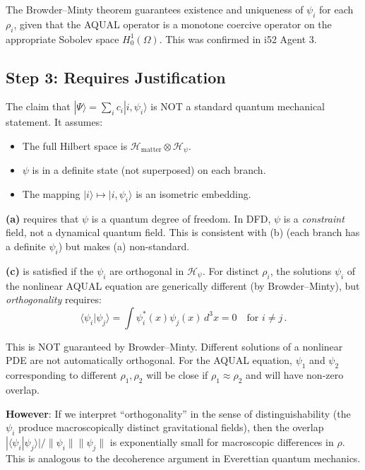 \documentclass[11pt,a4paper]{article}
\begin{document}
The Browder--Minty theorem guarantees existence and uniqueness of $\psi_i$ for each $\rho_i$, given that the AQUAL operator is a monotone coercive operator on the appropriate Sobolev space $H^1_0(\Omega)$. This was confirmed in i52 Agent 3.

\subsection{Step 3: Requires Justification}

The claim that $|\Psi\rangle = \sum_i c_i |i, \psi_i\rangle$ is NOT a standard quantum mechanical statement. It assumes:
\begin{itemize}
\item[(a)] The full Hilbert space is $\mathcal{H}_{\mathrm{matter}} \otimes \mathcal{H}_\psi$.
\item[(b)] $\psi$ is in a definite state (not superposed) on each branch.
\item[(c)] The mapping $|i\rangle \mapsto |i, \psi_i\rangle$ is an isometric embedding.
\end{itemize}

\textbf{(a)} requires that $\psi$ is a quantum degree of freedom. In DFD, $\psi$ is a \emph{constraint} field, not a dynamical quantum field. This is consistent with (b) (each branch has a definite $\psi_i$) but makes (a) non-standard.

\textbf{(c)} is satisfied if the $\psi_i$ are orthogonal in $\mathcal{H}_\psi$. For distinct $\rho_i$, the solutions $\psi_i$ of the nonlinear AQUAL equation are generically different (by Browder--Minty), but \emph{orthogonality} requires:
\begin{equation}
\langle \psi_i | \psi_j \rangle = \int \psi_i^*(x) \psi_j(x)\,d^3x = 0 \quad \text{for } i \neq j\,.
\end{equation}

This is NOT guaranteed by Browder--Minty. Different solutions of a nonlinear PDE are not automatically orthogonal. For the AQUAL equation, $\psi_1$ and $\psi_2$ corresponding to different $\rho_1, \rho_2$ will be close if $\rho_1 \approx \rho_2$ and will have non-zero overlap.

\textbf{However}: If we interpret ``orthogonality'' in the sense of distinguishability (the $\psi_i$ produce macroscopically distinct gravitational fields), then the overlap $|\langle\psi_i|\psi_j\rangle|/\|\psi_i\|\|\psi_j\|$ is exponentially small for macroscopic differences in $\rho$. This is analogous to the decoherence argument in Everettian quantum mechanics.
\end{document}
